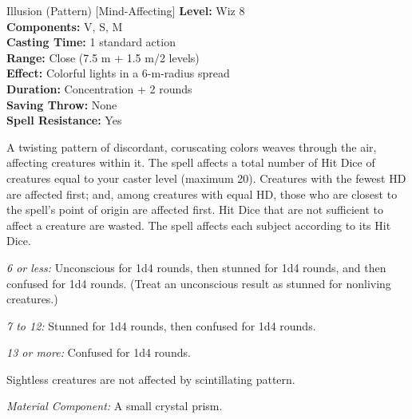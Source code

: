 {Illusion (Pattern) [Mind-Affecting]}
{
	\textbf{Level:}
	Wiz 8\\
	\textbf{Components:}
	V, S, M\\
	\textbf{Casting Time:}
	1 standard action\\
	\textbf{Range:}
	Close (7.5 m + 1.5 m/2 levels)\\
	\textbf{Effect:}
	Colorful lights in a 6-m-radius spread\\
	\textbf{Duration:}
	Concentration + 2 rounds\\
	\textbf{Saving Throw:}
	None\\
	\textbf{Spell Resistance:}
	Yes\\
}
{
	A twisting pattern of discordant, coruscating colors weaves through the air, affecting creatures within it. The spell affects a total number of Hit Dice of creatures equal to your caster level (maximum 20). Creatures with the fewest HD are affected first; and, among creatures with equal HD, those who are closest to the spell's point of origin are affected first. Hit Dice that are not sufficient to affect a creature are wasted. The spell affects each subject according to its Hit Dice.

	\textit{6 or less:}
Unconscious for 1d4 rounds, then stunned for 1d4 rounds, and then confused for 1d4 rounds. (Treat an unconscious result as stunned for nonliving creatures.)

	\textit{7 to 12:}
	Stunned for 1d4 rounds, then confused for 1d4 rounds.

	\textit{13 or more:}
	Confused for 1d4 rounds.

	Sightless creatures are not affected by scintillating pattern.

	\textit{Material Component:}
	A small crystal prism.

}
